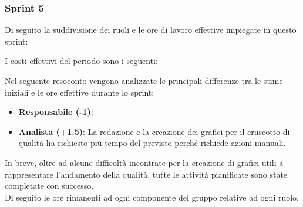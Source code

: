 \subsubsection{Sprint 5}
Di seguito la suddivisione dei ruoli e le ore di lavoro effettive impiegate in questo sprint:



I costi effettivi del periodo sono i seguenti:



Nel seguente resoconto vengono analizzate le principali differenze tra le stime iniziali e le ore effettive durante lo sprint:
\begin{itemize}
    \item \textbf{Responsabile (-1)}; 
    \item \textbf{Analista (+1.5)}: La redazione e la creazione dei grafici per il cruscotto di qualità ha richiesto più tempo del previsto perché richiede azioni manuali.
\end{itemize}
In breve, oltre ad alcune difficoltà incontrate per la creazione di grafici utili a rappresentare l'andamento della qualità, tutte le attività pianificate sono state completate con successo.\\
Di seguito le ore rimanenti ad ogni componente del gruppo relative ad ogni ruolo.

